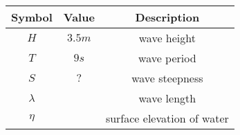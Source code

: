 \begin{tabular}{|c|c|c|}
	\hline
	\textbf{Symbol} & \textbf{Value} &
	\textbf{Description}\\[6pt]
	\hline
	$H$ &  $3.5m$ & wave height\\[6pt]
	\hline 
	$T$ & $9s$ & wave period\\[6pt]
	\hline
	$S$ & $ ? $ & wave steepness\\[6pt]
	\hline
	$\lambda$ & $  $ & wave length\\[6pt]
	\hline
	$\eta$ & $  $ & surface elevation of water\\[6pt]
	\hline
\end{tabular}
